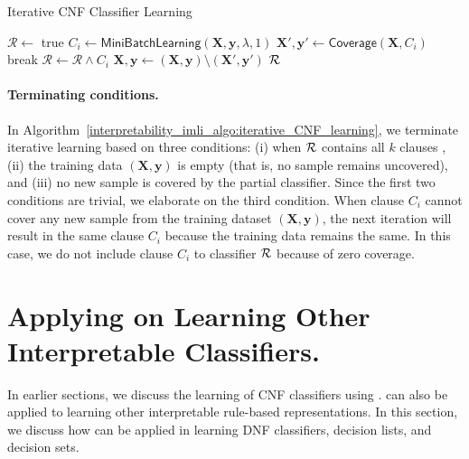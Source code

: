 \begin{algorithm}
	\caption{Iterative CNF Classifier Learning}
	\label{interpretability_imli_algo:iterative_CNF_learning}
	\begin{algorithmic}[1]
		\State $ \mathcal{R} \leftarrow $ true 
		\State $ C_i \leftarrow \mathsf{MiniBatchLearning}( \mathbf{X},\mathbf{y},\lambda, 1) $ 
		\label{interpretability_imli_algo:iterative_CNF_learning_incremental_learning}
		\State $ \mathbf{X}',\mathbf{y}' \leftarrow \mathsf{Coverage}(\mathbf{X}, C_i) $
		\label{interpretability_imli_algo:iterative_CNF_learning_coverage}
		 
		\State break
		\EndIf
		\State $ \mathcal{R} \leftarrow \mathcal{R}  \wedge C_i $
		\State $ \mathbf{X},\mathbf{y}  \leftarrow (\mathbf{X},\mathbf{y})  \setminus (\mathbf{X}',\mathbf{y}') $ 
		\EndFor
		\State \Return $ {\mathcal{R}} $
		\EndProcedure
	\end{algorithmic}
\end{algorithm}

\paragraph{Terminating conditions.} In Algorithm~\ref{interpretability_imli_algo:iterative_CNF_learning}, we terminate iterative learning based on three conditions: (i) when $ {\mathcal{R}} $ contains all $ k $ clauses , (ii) the training data $ (\mathbf{X},\mathbf{y}) $ is empty (that is, no sample remains uncovered), and (iii) no new sample is covered by the partial classifier. Since the first two conditions are trivial, we elaborate on the third condition. When clause $ C_i $ cannot cover any new sample from the training dataset $ (\mathbf{X},\mathbf{y}) $, the next iteration will result in the same clause $ C_i $ because the training data remains the same. In this case, we do not include clause $ C_i $ to classifier $ {\mathcal{R}} $ because of zero coverage. 




\section{Applying {\imli} on Learning Other Interpretable Classifiers.}
\label{interpretability_imli_sec:application}
In earlier sections, we discuss the learning of CNF classifiers using  {\imli}. {\imli} can also be applied to learning other interpretable rule-based representations. In this section, we discuss how {\imli} can be applied in learning DNF classifiers, decision lists, and decision sets.

